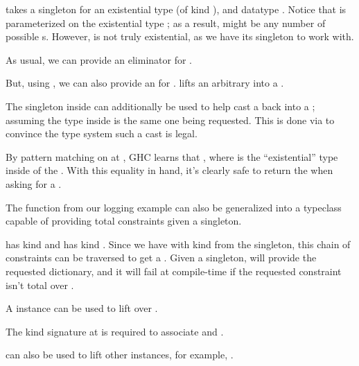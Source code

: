 \documentclass[book.tex]{subfiles}
\begin{document}

 takes a singleton for an existential type  (of kind ),
and datatype . Notice that  is parameterized on the existential
type ; as a result,  might be any number of possible s. However,  is not truly existential, as we have its singleton to work
with.

As usual, we can provide an eliminator for .


But, using , we can also provide an  for
.  lifts an arbitrary  into a .


The singleton inside  can additionally be used to help cast a
 back into a ; assuming the type inside is the same one
being requested. This is done via  to convince the type system such
a cast is legal.


By pattern matching on  at , GHC learns that ,
where  is the ``existential'' type inside of the . With this
equality in hand, it's clearly safe to return the  when asking for a
.

The  function from our logging example can also be generalized into a
typeclass capable of providing total constraints given a singleton.


 has kind  and  has kind .
Since we have  with kind  from the singleton, this chain of
constraints can be traversed to get a . Given a singleton,
 will provide the requested dictionary, and it will fail at
compile-time if the requested constraint isn't total over .

A  instance can be used to lift  over .


The \gls{kind signature} at  is required to associate  and .

 can also be used to lift other instances, for example, .

\end{document}
